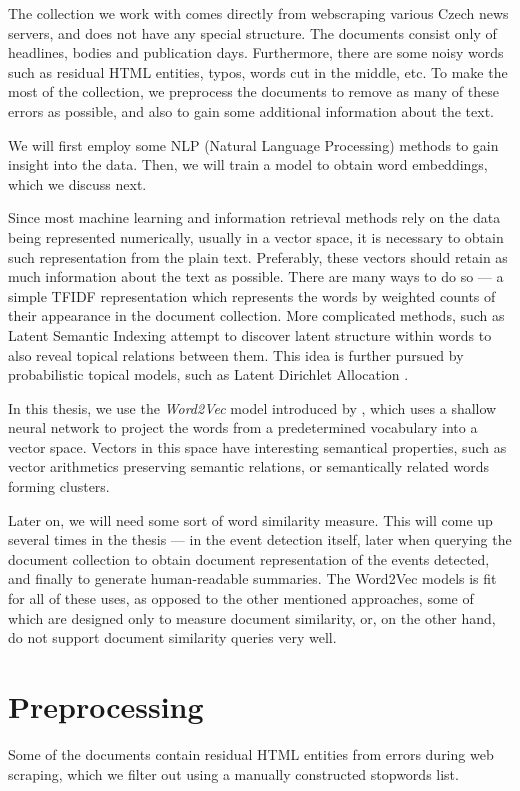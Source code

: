 The collection we work with comes directly from webscraping various Czech news servers, and does not have any special structure. The documents consist only of headlines, bodies and publication days. Furthermore, there are some noisy words such as residual HTML entities, typos, words cut in the middle, etc. To make the most of the collection, we preprocess the documents to remove as many of these errors as possible, and also to gain some additional information about the text.

We will first employ some NLP (Natural Language Processing) methods to gain insight into the data. Then, we will train a model to obtain word embeddings, which we discuss next.

Since most machine learning and information retrieval methods rely on the data being represented numerically, usually in a vector space, it is necessary to obtain such representation from the plain text. Preferably, these vectors should retain as much information about the text as possible. There are many ways to do so --- a simple TFIDF representation \cite{information-retrieval} which represents the words by weighted counts of their appearance in the document collection. More complicated methods, such as Latent Semantic Indexing \cite{lsi} attempt to discover latent structure within words to also reveal topical relations between them. This idea is further pursued by probabilistic topical models, such as Latent Dirichlet Allocation \cite{lda}.

In this thesis, we use the \textit{Word2Vec} model introduced by \cite{Word2Vec, distributed-representations, linguistic-regularities}, which uses a shallow neural network to project the words from a predetermined vocabulary into a vector space. Vectors in this space have interesting semantical properties, such as vector arithmetics preserving semantic relations, or semantically related words forming clusters.

Later on, we will need some sort of word similarity measure. This will come up several times in the thesis --- in the event detection itself, later when querying the document collection to obtain document representation of the events detected, and finally to generate human-readable summaries. The Word2Vec models is fit for all of these uses, as opposed to the other mentioned approaches, some of which are designed only to measure document similarity, or, on the other hand, do not support document similarity queries very well.


\section{Preprocessing}
Some of the documents contain residual HTML entities from errors during web scraping, which we filter out using a manually constructed stopwords list.

